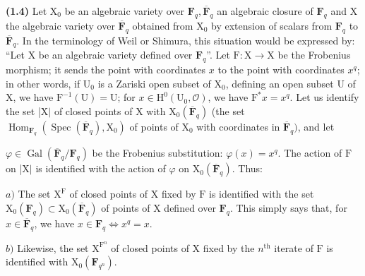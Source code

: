 \documentclass[10pt,leqno]{article}
\begin{document}
\noindent \textbf{(1.4)} Let \(\mathrm{X}_{0}\) be an algebraic variety over \(\mathbf{F}_{q}, \overline{\mathbf{F}}_{q}\) an algebraic closure of \(\mathbf{F}_{q}\) and \(\mathrm{X}\) the algebraic variety over \(\overline{\mathbf{F}}_{q}\) obtained from \(\mathrm{X}_{0}\) by extension of scalars from \(\mathbf{F}_{q}\) to \(\overline{\mathbf{F}}_{q}\). In the terminology of Weil or Shimura, this situation would be expressed by: “Let \(\mathrm{X}\) be an algebraic variety defined over \(\mathbf{F}_{q}\)”. Let \(\mathrm{F} : \mathrm{X}\longrightarrow \mathrm{X}\) be the Frobenius morphism; it sends the point with coordinates \(x\) to the point with coordinates \(x^{q}\); in other words, if \(\mathrm{U}_{0}\) is a Zariski open subset of \(\mathrm{X}_{0}\), defining an open subset \(\mathrm{U}\) of \(\mathrm{X}\), we have \(\mathrm{F}^{- 1}(\mathrm{U})=\mathrm{U}\); for \(x\in \mathrm{H}^{0}(\mathrm{U}_{0}, \mathcal{O})\), we have \(\mathrm{F}^{*}x=x^{q}\). Let us identify the set |\(\mathrm{X}|\) of closed points of \(\mathrm{X}\) with \(\mathrm{X}_{0}(\overline{\mathbf{F}}_{q})\) (the set \(\operatorname{Hom}_{\mathbf{F}_{q}}(\operatorname{Spec}(\overline{\mathbf{F}}_{q}), \mathrm{X}_{0})\) of points of \(\mathrm{X}_{0}\) with coordinates in \(\overline{\mathbf{F}}_{q})\), and let\par

\clearpage

\label{physical-4}

\noindent \(\varphi \in \operatorname{Gal}(\overline{\mathbf{F}}_{q}/\mathbf{F}_{q})\) be the Frobenius substitution: \(\varphi (x)=x^{q}\). The action of \(\mathrm{F}\) on |\(\mathrm{X}|\) is identified with the action of \(\varphi \) on \(\mathrm{X}_{0}(\overline{\mathbf{F}}_{q})\). Thus:\par

\noindent \(a)\) The set \(\mathrm{X}^{\mathrm{F}}\) of closed points of \(\mathrm{X}\) fixed by \(\mathrm{F}\) is identified with the set \(\mathrm{X}_{0}(\mathbf{F}_{q})\subset \mathrm{X}_{0}(\overline{\mathbf{F}}_{q})\) of points of \(\mathrm{X}\) defined over \(\mathbf{F}_{q}\). This simply says that, for \(x\in \overline{\mathbf{F}}_{q}\), we have \(x\in \mathbf{F}_{q} \Leftrightarrow  x^{q}=x\).\par

\noindent \(b)\) Likewise, the set \(\mathrm{X}^{\mathrm{F}^{n}}\) of closed points of \(\mathrm{X}\) fixed by the \(n^{\mathrm{th}}\) iterate of \(\mathrm{F}\) is identified with \(\mathrm{X}_{0}(\mathbf{F}_{q^{n}})\).\par
\end{document}

